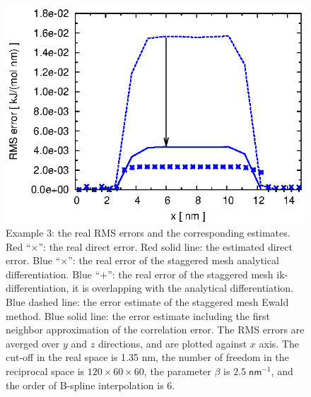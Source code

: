 \documentclass[aps,pre,preprint]{revtex4}
\begin{document}
\begin{figure}
  \centering
  \includegraphics[]{fig.new//fig.water.ana.st.error.eps}
  \caption{
    Example 3: the real RMS errors and the corresponding
    estimates. 
    Red ``$\times$'': the real direct error.
    Red solid line: the estimated direct error.
    Blue ``$\times$'': the real error of the staggered mesh
    analytical differentiation.
    Blue ``$+$'': the real error of the staggered mesh
    ik-differentiation, it is overlapping with the analytical differentiation.
    Blue dashed line: the error estimate of  the staggered mesh Ewald method.
    Blue solid line: the error estimate including the first
    neighbor approximation of the correlation error.
    The RMS errors are averged over $y$ and $z$ directions, and are
    plotted against $x$ axis.
    The cut-off in the real space is 1.35 \textsf{nm}, the number of
    freedom in the reciprocal space is $120\times 60\times 60$, the
    parameter $\beta$ is $2.5\; \textsf{nm}^{-1}$, and the order of
    B-spline interpolation is 6.
  }   
  \label{fig:water-error}
\end{figure}
\end{document}
